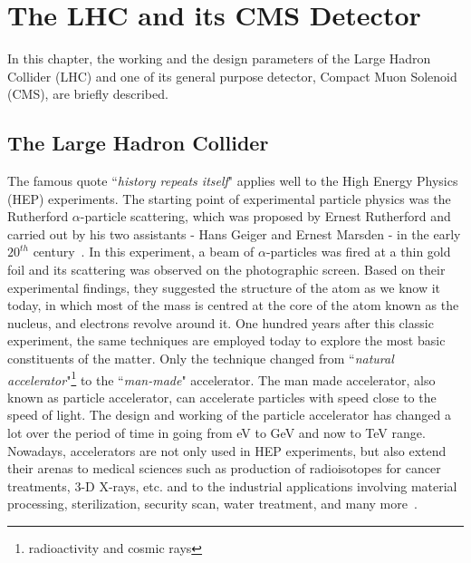 \chapter{The LHC and its CMS Detector} %
\label{cha:the_lhc_and_cms_machine}

In this chapter, the working and the design parameters of the Large Hadron Collider (LHC) and one of its general purpose detector, Compact Muon Solenoid (CMS), are briefly described.


\section{The Large Hadron Collider} %
\label{sec:the_large_hadron_collider}

The famous quote ``{\textit{history repeats itself}}" applies well to the High Energy Physics (HEP) experiments. 
The starting point of experimental particle physics was the Rutherford $\alpha$-particle scattering, which was proposed by Ernest Rutherford and carried out by his two assistants - Hans Geiger and Ernest Marsden - in the early $20^{th}$ century~\cite{Hauptman2010}. 
In this experiment, a beam of $\alpha$-particles was fired at a thin gold foil and its scattering was observed on the photographic screen. 
Based on their experimental findings, they suggested the structure of the atom as we know it today, in which most of the mass is centred at the core of the atom known as the nucleus, and electrons  revolve around it. 
One hundred years after this classic experiment, the same techniques are employed today to explore the most basic constituents of the matter. 
Only the technique changed from ``{\textit{natural accelerator}}"\footnote{radioactivity and cosmic rays} to the ``{\textit{man-made}}" accelerator.
The man made accelerator, also known as particle accelerator, can accelerate particles with speed close to the speed of light. 
The design and working of the particle accelerator has changed a lot over the period of time in going from eV to GeV and now to TeV range. 
Nowadays, accelerators are not only used in HEP experiments, but also extend their arenas to medical sciences such as production of radioisotopes for cancer treatments, 3-D X-rays, etc. and to the industrial applications involving material processing, sterilization, security scan, water treatment, and many more~\cite{Demarteau2016}. 

